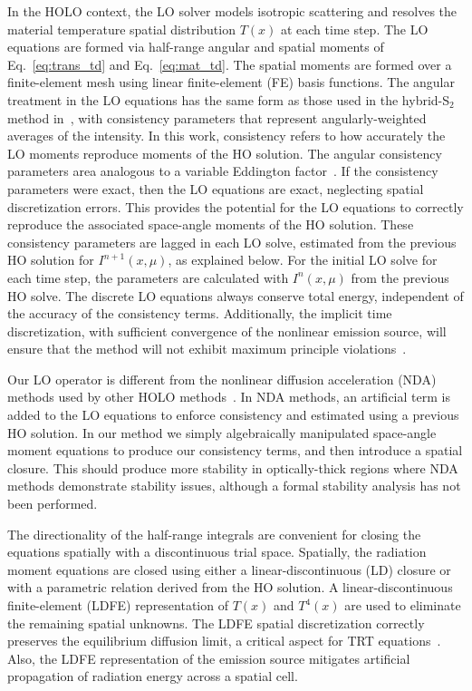 In the HOLO context, the LO solver models isotropic scattering and
resolves the material temperature spatial distribution $T(x)$ at each time step.  The LO equations are formed via half-range 
angular and spatial moments of
Eq.~\eqref{eq:trans_td} and Eq.~\eqref{eq:mat_td}. 
The spatial moments are formed over a
finite-element mesh using linear finite-element (FE) basis functions.   The angular treatment in the LO equations has the same form as those
used in the hybrid-S$_2$ method in~\cite{wolters},  with consistency parameters that
represent angularly-weighted averages of the intensity.  In this work, consistency refers
to how accurately the LO moments reproduce moments of the HO solution.
The angular consistency parameters
area analogous to a variable Eddington factor~\cite{chandrasekhar}.  If the consistency parameters were exact, then the LO
equations are exact, neglecting spatial discretization errors.  This provides the
potential for the LO equations to correctly reproduce the associated space-angle
moments of the HO solution. These consistency
parameters are lagged in each LO solve, estimated from the previous HO solution for
$I^{n+1}(x,\mu)$, as explained below. For the initial LO solve for each time step, the
parameters are calculated with $I^{n}(x,\mu)$ from the previous HO solve.  The discrete LO equations always conserve
total energy, independent of the accuracy of the consistency terms. 
Additionally, the
implicit time discretization, with sufficient convergence of the nonlinear emission
source, will ensure that the method will not exhibit maximum principle
violations~\cite{larsen_mpv}.

Our LO operator is different from the nonlinear
diffusion acceleration (NDA) methods used by other HOLO methods~\cite{rmc,park,willert}.  In
NDA methods, an artificial term is added to the LO equations to enforce consistency and estimated using a
previous HO solution.  In our method we simply algebraically 
manipulated space-angle moment equations to produce our consistency terms, and then
introduce a spatial closure. This should produce more
stability in optically-thick regions where NDA methods demonstrate stability issues,
although a formal stability analysis has not been performed.

The directionality of the half-range integrals are convenient for closing the equations
spatially with a discontinuous trial space.  Spatially, the radiation moment
equations are closed using either a linear-discontinuous (LD) closure or with a
parametric relation derived from the HO solution.  A linear-discontinuous
finite-element (LDFE) representation of $T(x)$
and $T^4(x)$ are used to eliminate the remaining spatial unknowns.
The LDFE spatial discretization correctly preserves the equilibrium diffusion limit, a
critical aspect for TRT equations~\cite{larsen_edl,morel_ldtrt}. Also, the LDFE
representation of the emission source mitigates artificial propagation of radiation
energy across a spatial cell.

